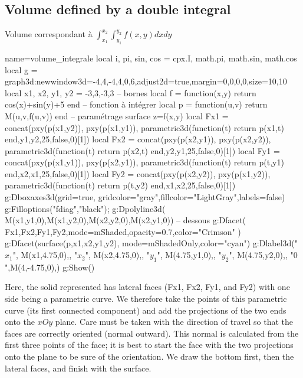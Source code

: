 \subsection{Volume defined by a double integral}
\begin{demo}{Volume correspondant à $\int_{x_1}^{x_2}\int_{y_1}^{y_2}f(x,y)dxdy$}
\begin{luadraw}{name=volume_integrale}
local i, pi, sin, cos = cpx.I, math.pi, math.sin, math.cos
local g = graph3d:new{window3d={-4,4,-4,4,0,6},adjust2d=true,margin={0,0,0,0},size={10,10}}
local x1, x2, y1, y2 = -3,3,-3,3 -- bornes
local f = function(x,y) return cos(x)+sin(y)+5 end -- fonction à intégrer
local p = function(u,v) return M(u,v,f(u,v)) end -- paramétrage surface z=f(x,y)
local Fx1 = concat({pxy(p(x1,y2)), pxy(p(x1,y1))}, parametric3d(function(t) return p(x1,t) end,y1,y2,25,false,0)[1])
local Fx2 = concat({pxy(p(x2,y1)), pxy(p(x2,y2))}, parametric3d(function(t) return p(x2,t) end,y2,y1,25,false,0)[1])
local Fy1 = concat({pxy(p(x1,y1)), pxy(p(x2,y1))}, parametric3d(function(t) return p(t,y1) end,x2,x1,25,false,0)[1])
local Fy2 = concat({pxy(p(x2,y2)), pxy(p(x1,y2))}, parametric3d(function(t) return p(t,y2) end,x1,x2,25,false,0)[1])
g:Dboxaxes3d({grid=true, gridcolor="gray",fillcolor="LightGray",labels=false})
g:Filloptions("fdiag","black"); g:Dpolyline3d( {M(x1,y1,0),M(x1,y2,0),M(x2,y2,0),M(x2,y1,0)}) -- dessous
g:Dfacet( {Fx1,Fx2,Fy1,Fy2},{mode=mShaded,opacity=0.7,color="Crimson"} )
g:Dfacet(surface(p,x1,x2,y1,y2), {mode=mShadedOnly,color="cyan"})
g:Dlabel3d("$x_1$", M(x1,4.75,0),{}, "$x_2$", M(x2,4.75,0),{}, "$y_1$", M(4.75,y1,0),{}, "$y_2$", M(4.75,y2,0),{}, "$0$",M(4,-4.75,0),{})  
g:Show()  
\end{luadraw}
\end{demo}

Here, the solid represented has lateral faces (Fx1, Fx2, Fy1, and Fy2) with one side being a parametric curve. We therefore take the points of this parametric curve (its first connected component) and add the projections of the two ends onto the $xOy$ plane. Care must be taken with the direction of travel so that the faces are correctly oriented (normal outward). This normal is calculated from the first three points of the face; it is best to start the face with the two projections onto the plane to be sure of the orientation.
We draw the bottom first, then the lateral faces, and finish with the surface.

